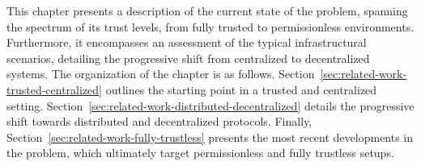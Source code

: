 This chapter presents a description of the current state of the \pol{} problem, spanning the spectrum of its trust levels, from fully trusted to permissionless environments. Furthermore, it encompasses an assessment of the typical infrastructural scenarios, detailing the progressive shift from centralized to decentralized systems. The organization of the chapter is as follows. Section~\ref{sec:related-work-trusted-centralized} outlines the starting point in a trusted and centralized setting. Section~\ref{sec:related-work-distributed-decentralized} details the progressive shift towards distributed and decentralized protocols. Finally, Section~\ref{sec:related-work-fully-trustless} presents the most recent developments in the \pol{} problem, which ultimately target permissionless and fully trustless setups. 

